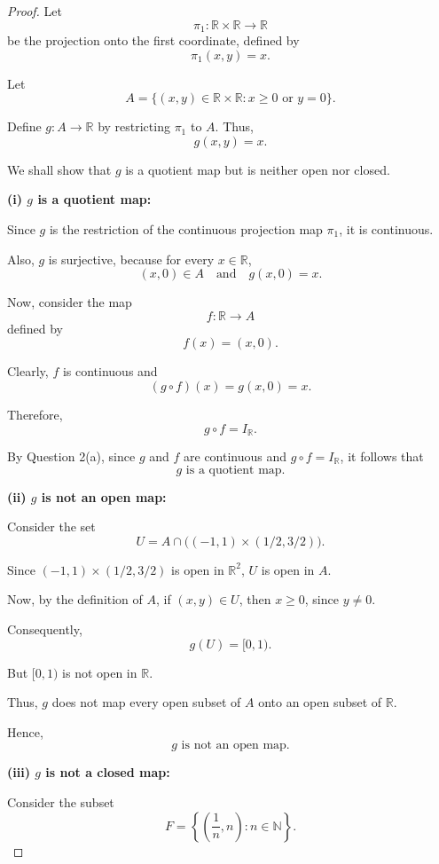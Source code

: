 \begin{proof}
Let
\[
\pi_1:\mathbb{R}\times\mathbb{R}\to\mathbb{R}
\]
be the projection onto the first coordinate, defined by
\[
\pi_1(x,y)=x.
\]

Let
\[
A=\{(x,y)\in\mathbb{R}\times\mathbb{R}:x\geq 0
\text{ or }y=0\}.
\]

Define \(g:A\to\mathbb{R}\) by restricting \(\pi_1\) to \(A\).
Thus,
\[
g(x,y)=x.
\]

We shall show that \(g\) is a quotient map but is neither
open nor closed.

\medskip

\textbf{(i) \(g\) is a quotient map:}

Since \(g\) is the restriction of the continuous projection
map \(\pi_1\), it is continuous.

Also, \(g\) is surjective, because for every \(x\in\mathbb{R}\),
\[
(x,0)\in A
\quad\text{and}\quad
g(x,0)=x.
\]

Now, consider the map
\[
f:\mathbb{R}\to A
\]
defined by
\[
f(x)=(x,0).
\]

Clearly, \(f\) is continuous and
\[
(g\circ f)(x)=g(x,0)=x.
\]

Therefore,
\[
g\circ f=I_{\mathbb{R}}.
\]

By Question 2(a), since \(g\) and \(f\) are continuous
and \(g\circ f=I_{\mathbb{R}}\), it follows that
\[
\boxed{g\text{ is a quotient map.}}
\]

\medskip

\textbf{(ii) \(g\) is not an open map:}

Consider the set
\[
U=A\cap\big((-1,1)\times(1/2,3/2)\big).
\]

Since \((-1,1)\times(1/2,3/2)\) is open in
\(\mathbb{R}^2\), \(U\) is open in \(A\).

Now, by the definition of \(A\), if \((x,y)\in U\),
then \(x\geq 0\), since \(y\neq 0\).

Consequently,
\[
g(U)=[0,1).
\]

But \([0,1)\) is not open in \(\mathbb{R}\).

Thus, \(g\) does not map every open subset of \(A\)
onto an open subset of \(\mathbb{R}\).

Hence,
\[
\boxed{g\text{ is not an open map.}}
\]

\medskip

\textbf{(iii) \(g\) is not a closed map:}

Consider the subset
\[
F=\left\{\left(\frac{1}{n},n\right):
n\in\mathbb{N}\right\}.
\]


\end{proof}
